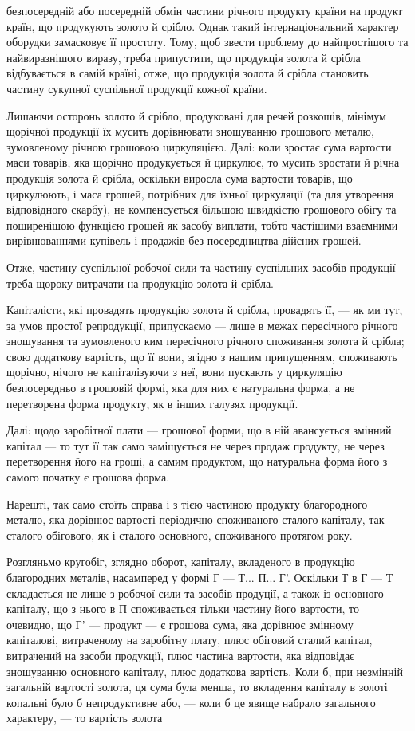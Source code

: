 \parcont{}  %
безпосередній або посередній обмін частини річного продукту країни на
продукт країн, що продукують золото й срібло. Однак такий інтернаціональний
характер оборудки замасковує її простоту. Тому, щоб звести
проблему до найпростішого та найвиразнішого виразу, треба припустити,
що продукція золота й срібла відбувається в самій країні, отже, що продукція
золота й срібла становить частину сукупної суспільної продукції
кожної країни.

Лишаючи осторонь золото й срібло, продуковані для речей розкошів,
мінімум щорічної продукції їх мусить дорівнювати зношуванню грошового
металю, зумовленому річною грошовою циркуляцією. Далі: коли
зростає сума вартости маси товарів, яка щорічно продукується й циркулює,
то мусить зростати й річна продукція золота й срібла, оскільки
виросла сума вартости товарів, що циркулюють, і маса грошей, потрібних
для їхньої циркуляції (та для утворення відповідного скарбу), не компенсується
більшою швидкістю грошового обігу та поширенішою функцією
грошей як засобу виплати, тобто частішими взаємними вирівнюваннями
купівель і продажів без посередництва дійсних грошей.

Отже, частину суспільної робочої сили та частину суспільних засобів
продукції треба щороку витрачати на продукцію золота й срібла.

Капіталісти, які провадять продукцію золота й срібла, провадять її, —
як ми тут, за умов простої репродукції, припускаємо — лише в межах
пересічного річного зношування та зумовленого ким пересічного річного
споживання золота й срібла; свою додаткову вартість, що її вони, згідно
з нашим припущенням, споживають щорічно, нічого не капіталізуючи з
неї, вони пускають у циркуляцію безпосередньо в грошовій формі, яка
для них є натуральна форма, а не перетворена форма продукту, як в інших
галузях продукції.

Далі: щодо заробітної плати — грошової форми, що в ній авансується
змінний капітал — то тут її так само заміщується не через продаж
продукту, не через перетворення його на гроші, а самим продуктом, що
натуральна форма його з самого початку є грошова форма.

Нарешті, так само стоїть справа і з тією частиною продукту благородного
металю, яка дорівнює вартості періодично споживаного сталого
капіталу, так сталого обігового, як і сталого основного, споживаного протягом
року.

Розгляньмо кругобіг, зглядно оборот, капіталу, вкладеного в продукцію
благородних металів, насамперед у формі Г — Т... П... Г'. Оскільки
Т в Г — Т складається не лише з робочої сили та засобів продуції, а також
із основного капіталу, що з нього в П споживається тільки частину
його вартости, то очевидно, що Г' — продукт — є грошова сума, яка
дорівнює змінному капіталові, витраченому на заробітну плату, плюс обіговий
сталий капітал, витрачений на засоби продукції, плюс частина
вартости, яка відповідає зношуванню основного капіталу, плюс додаткова
вартість. Коли б, при незмінній загальній вартості золота, ця сума була
менша, то вкладення капіталу в золоті копальні було б непродуктивне
або, — коли б це явище набрало загального характеру, — то вартість золота
\parbreak{}  %
